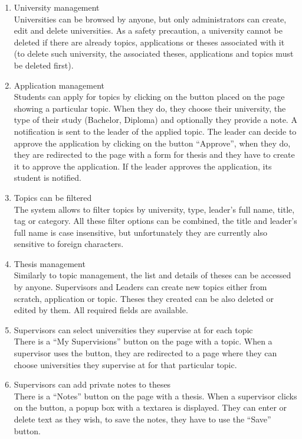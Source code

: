 \begin{enumerate}
    \item University management\\
    Universities can be browsed by anyone, but only administrators can create, edit and delete universities. As a safety precaution, a university cannot be deleted if there are already topics, applications or theses associated with it (to delete such university, the associated theses, applications and topics must be deleted first).

    \item Application management\\
    Students can apply for topics by clicking on the button placed on the page showing a particular topic. When they do, they choose their university, the type of their study (Bachelor, Diploma) and optionally they provide a note. A notification is sent to the leader of the applied topic. The leader can decide to approve the application by clicking on the button ``Approve'', when they do, they are redirected to the page with a form for thesis and they have to create it to approve the application. If the leader approves the application, its student is notified.

    \item Topics can be filtered\\
    The system allows to filter topics by university, type, leader's full name, title, tag or category. All these filter options can be combined, the title and leader's full name is case insensitive, but unfortunately they are currently also sensitive to foreign characters.

    \item Thesis management\\
    Similarly to topic management, the list and details of theses can be accessed by anyone. Supervisors and Leaders can create new topics either from scratch, application or topic. Theses they created can be also deleted or edited by them. All required fields are available.

    \item Supervisors can select universities they supervise at for each topic\\
    There is a ``My Supervisions'' button on the page with a topic. When a supervisor uses the button, they are redirected to a page where they can choose universities they supervise at for that particular topic.

    \item Supervisors can add private notes to theses\\
    There is a ``Notes'' button on the page with a thesis. When a supervisor clicks on the button, a popup box with a textarea is displayed. They can enter or delete text as they wish, to save the notes, they have to use the ``Save'' button.


\end{enumerate}
